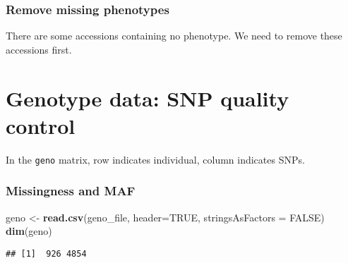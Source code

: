\documentclass[
]{article}
\newenvironment{Shaded}{\begin{snugshade}}{\end{snugshade}}
\newcommand{\AttributeTok}[1]{\textcolor[rgb]{0.13,0.29,0.53}{#1}}
\newcommand{\CommentTok}[1]{\textcolor[rgb]{0.56,0.35,0.01}{\textit{#1}}}
\newcommand{\ConstantTok}[1]{\textcolor[rgb]{0.56,0.35,0.01}{#1}}
\newcommand{\DecValTok}[1]{\textcolor[rgb]{0.00,0.00,0.81}{#1}}
\newcommand{\FunctionTok}[1]{\textcolor[rgb]{0.13,0.29,0.53}{\textbf{#1}}}
\newcommand{\NormalTok}[1]{#1}
\newcommand{\OtherTok}[1]{\textcolor[rgb]{0.56,0.35,0.01}{#1}}
\newcommand{\SpecialCharTok}[1]{\textcolor[rgb]{0.81,0.36,0.00}{\textbf{#1}}}
\begin{document}
\subsubsection{Remove missing
phenotypes}\label{remove-missing-phenotypes}

There are some accessions containing no phenotype. We need to remove
these accessions first.

\begin{Shaded}
\end{Shaded}

\section{Genotype data: SNP quality
control}\label{genotype-data-snp-quality-control}

In the \texttt{geno} matrix, row indicates individual, column indicates
SNPs.

\subsubsection{Missingness and MAF}\label{missingness-and-maf}

\begin{Shaded}
\begin{Highlighting}[]
\NormalTok{geno }\OtherTok{\textless{}{-}} \FunctionTok{read.csv}\NormalTok{(geno\_file, }\AttributeTok{header=}\ConstantTok{TRUE}\NormalTok{, }\AttributeTok{stringsAsFactors =} \ConstantTok{FALSE}\NormalTok{)}
\FunctionTok{dim}\NormalTok{(geno)}
\end{Highlighting}
\end{Shaded}

\begin{verbatim}
## [1]  926 4854
\end{verbatim}
\end{document}
